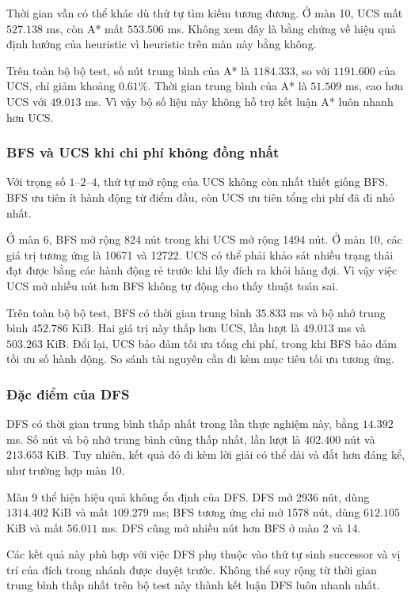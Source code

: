 Thời gian vẫn có thể khác dù thứ tự tìm kiếm tương đương.
Ở màn 10, UCS mất $527.138$ ms, còn A* mất $553.506$ ms.
Không xem đây là bằng chứng về hiệu quả định hướng
của heuristic vì heuristic trên màn này bằng không.

Trên toàn bộ bộ test, số nút trung bình của A* là
$1184.333$, so với $1191.600$ của UCS, chỉ giảm khoảng
$0.61\%$. Thời gian trung bình của A* là $51.509$ ms,
cao hơn UCS với $49.013$ ms. Vì vậy bộ số liệu này
không hỗ trợ kết luận A* luôn nhanh hơn UCS.

\subsubsection{BFS và UCS khi chi phí không đồng nhất}

Với trọng số $1$--$2$--$4$, thứ tự mở rộng của UCS không còn
nhất thiết giống BFS. BFS ưu tiên ít hành động từ điểm đầu,
còn UCS ưu tiên tổng chi phí đã đi nhỏ nhất.

Ở màn 6, BFS mở rộng 824 nút trong khi UCS mở rộng 1494 nút.
Ở màn 10, các giá trị tương ứng là 10671 và 12722.
UCS có thể phải khảo sát nhiều trạng thái đạt được bằng
các hành động rẻ trước khi lấy đích ra khỏi hàng đợi.
Vì vậy việc UCS mở nhiều nút hơn BFS không tự động cho thấy
thuật toán sai.

Trên toàn bộ bộ test, BFS có thời gian trung bình
$35.833$ ms và bộ nhớ trung bình $452.786$ KiB.
Hai giá trị này thấp hơn UCS, lần lượt là $49.013$ ms và
$503.263$ KiB. Đổi lại, UCS bảo đảm tối ưu tổng chi phí,
trong khi BFS bảo đảm tối ưu số hành động.
So sánh tài nguyên cần đi kèm mục tiêu tối ưu tương ứng.

\subsubsection{Đặc điểm của DFS}

DFS có thời gian trung bình thấp nhất trong lần thực nghiệm
này, bằng $14.392$ ms. Số nút và bộ nhớ trung bình cũng thấp
nhất, lần lượt là $402.400$ nút và $213.653$ KiB.
Tuy nhiên, kết quả đó đi kèm lời giải có thể dài và đắt hơn
đáng kể, như trường hợp màn 10.

Màn 9 thể hiện hiệu quả không ổn định của DFS.
DFS mở 2936 nút, dùng $1314.402$ KiB và mất $109.279$ ms;
BFS tương ứng chỉ mở 1578 nút, dùng $612.105$ KiB và mất
$56.011$ ms. DFS cũng mở nhiều nút hơn BFS ở màn 2 và 14.

Các kết quả này phù hợp với việc DFS phụ thuộc vào
thứ tự sinh successor và vị trí của đích trong nhánh
được duyệt trước. Không thể suy rộng từ thời gian trung bình
thấp nhất trên bộ test này thành kết luận DFS luôn nhanh nhất.

